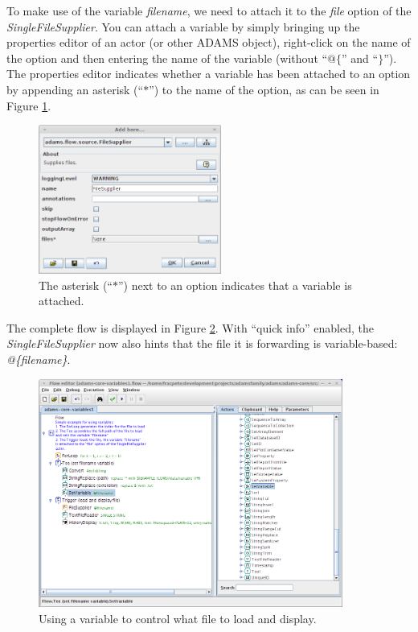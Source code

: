 To make use of the variable \textit{filename}, we need to attach it to the
\textit{file} option of the \textit{SingleFileSupplier}. You can attach a
variable by simply bringing up the properties editor of an actor (or other
ADAMS object), right-click on the name of the option and then entering the name
of the variable (without ``$@\{$'' and ``$\}$''). The properties editor
indicates whether a variable has been attached to an option by appending an asterisk
(``$*$'') to the name of the option, as can be seen in Figure
\ref{floweditor-variables1_flow-detail}.
\begin{figure}[htb]
  \centering
  \includegraphics[width=6.0cm]{images/floweditor-variables1_flow-detail.png}
  \caption{The asterisk (``$*$'') next to an option indicates that a variable is
  attached.}
  \label{floweditor-variables1_flow-detail}
\end{figure}

The complete flow is displayed in Figure \ref{floweditor-variables1_flow}. With
``quick info'' enabled, the \textit{SingleFileSupplier} now also hints that the
file it is forwarding is variable-based: \textit{@\{filename\}}.
\begin{figure}[htb]
  \centering
  \includegraphics[width=10.0cm]{images/floweditor-variables1_flow.png}
  \caption{Using a variable to control what file to load and display.}
  \label{floweditor-variables1_flow}
\end{figure}

